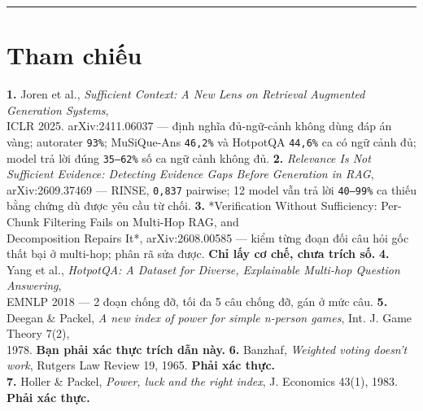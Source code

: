 \documentclass[11pt,a4paper]{article}
\begin{document}
\vspace{0.3em}\hrule\vspace{0.6em}

\section{Tham chiếu}

\textbf{1.} Joren et al., \emph{Sufficient Context: A New Lens on Retrieval Augmented Generation Systems},\\
   ICLR 2025. arXiv:2411.06037 — định nghĩa đủ-ngữ-cảnh không dùng đáp án vàng; autorater
   \texttt{93\%}; MuSiQue-Ans \texttt{46,2\%} và HotpotQA \texttt{44,6\%} ca có ngữ cảnh đủ; model trả lời đúng
   \texttt{35–62\%} số ca ngữ cảnh không đủ.
\textbf{2.} \emph{Relevance Is Not Sufficient Evidence: Detecting Evidence Gaps Before Generation in RAG},\\
   arXiv:2609.37469 — RINSE, \texttt{0,837} pairwise; 12 model vẫn trả lời \texttt{40–99\%} ca thiếu bằng
   chứng dù được yêu cầu từ chối.
\textbf{3.} *Verification Without Sufficiency: Per-Chunk Filtering Fails on Multi-Hop RAG, and\\
   Decomposition Repairs It*, arXiv:2608.00585 — kiểm từng đoạn đối câu hỏi gốc thất bại ở
   multi-hop; phân rã sửa được. \textbf{Chỉ lấy cơ chế, chưa trích số.}
\textbf{4.} Yang et al., \emph{HotpotQA: A Dataset for Diverse, Explainable Multi-hop Question Answering},\\
   EMNLP 2018 — 2 đoạn chống đỡ, tối đa 5 câu chống đỡ, gán ở mức câu.
\textbf{5.} Deegan \& Packel, \emph{A new index of power for simple n-person games}, Int. J. Game Theory 7(2),\\
   1978. \textbf{Bạn phải xác thực trích dẫn này.}
\textbf{6.} Banzhaf, \emph{Weighted voting doesn't work}, Rutgers Law Review 19, 1965. \textbf{Phải xác thực.}\\
\textbf{7.} Holler \& Packel, \emph{Power, luck and the right index}, J. Economics 43(1), 1983.\\
   \textbf{Phải xác thực.}
\end{document}
